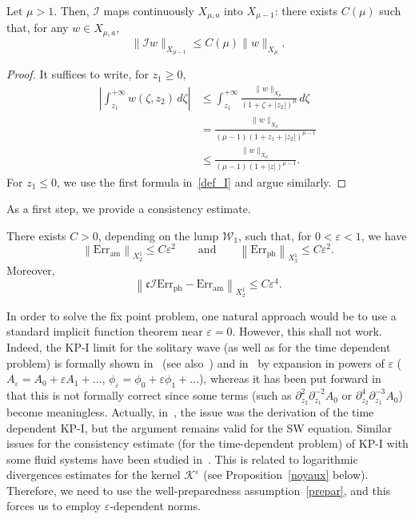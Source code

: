 \documentclass[10pt]{amsart}
\theoremstyle{definition}\newtheorem{defi}[theo]{Definition}\newtheorem{rema}[theo]{Remark}\newtheorem{exam}[theo]{Example}\newtheorem{exem}[theo]{Example}\newtheorem{nota}[theo]{Notation}
\newcommand*\p{\partial}
\newcommand{\amm}{\mathrm{am}}
\newcommand{\phl}{\mathrm{ph}}
\newcommand{\Err}{\mathrm{Err}}
\newcommand*\BI{\mathcal{I}}
\newcommand*\BK{\mathcal{K}}
\newcommand*\BW{\mathcal{W}}
\newcommand*\cs{{\mathfrak c}}
\newcommand*\ii{\infty}
\newcommand*\gs{\geqslant }
\newcommand*\ls{\leqslant }
\newcommand*\e{\varepsilon}
\begin{document}
\begin{prop}\label{primit}
Let $ \mu > 1 $. Then, $ \BI $ maps continuously $ X_{\mu,a} $ into $ X_{\mu -1 } $: there exists $ C(\mu) $ such that, for any $ w \in X_{\mu,a} $,
\[
\| \BI w \|_{X_{\mu-1}} \ls C(\mu) \| w \|_{X_{\mu}}.
\]
\end{prop}

\begin{proof}
It suffices to write, for $ z_1 \gs 0 $,
\begin{align*}
\left\lvert \int_{z_1}^{+\ii} w (\zeta, z_2) \, d\zeta \right\rvert & \ls \int_{z_1}^{+\ii} \frac{ \| w\|_{X_\mu} }{ (1 + \zeta + | z_2|)^\mu } \, d\zeta
\\ & = \frac{\| w\|_{X_\mu} }{ (\mu-1) (1 + z_1 + | z_2|)^{\mu-1} }
\\ &
\ls \frac{\| w\|_{X_\mu} }{ (\mu-1) (1 + | z|)^{\mu-1} }.
\end{align*}
For $z_1 \ls 0 $, we use the first formula in~\eqref{def_I} and argue similarly.
\end{proof}


As a first step, we provide a consistency estimate.
\begin{prop}\label{consistance}
There exists $ C > 0 $, depending on the lump $ \BW_1 $, such that, for $ 0 < \e <1 $, we have
\[
\left\| {\Err}_{\amm} \right\|_{X^1_2} \ls C \e^2
\qquad  \text{and} \qquad
\left\| {\Err}_{\phl} \right\|_{X^1_3} \ls C \e^2.
\]
Moreover,
\[
\left\| \cs \BI {\Err}_{\phl} - {\Err}_{\amm} \right\|_{X^1_2} \ls C \e^4.
\]
\end{prop}



In order to solve the fix point problem, one natural approach would be to use a standard implicit function theorem near $ \e = 0 $. However, this shall not work. Indeed, the KP-I limit for the solitary wave (as well as for the time dependent problem) is formally shown in~\cite{JR} (see also~\cite{BerRob:04}) and in~\cite{Kiv-Pel} by expansion in powers of $ \e $ ($ A_\e = A_0 + \e A_1 + \dotsc $, $ \phi_\e = \phi_0 + \e \phi_1 + \dotsc $), whereas it has been put forward in~\cite[Section~1.3]{Cerror} that this is not formally correct since some terms (such as $ \p_{z_2}^2 \p_{z_1}^{-2} A_0 $ or $ \p_{z_2}^4 \p_{z_1}^{-3} A_0 $) become meaningless. Actually, in~\cite{Cerror}, the issue was the derivation of the time dependent KP-I, but the argument remains valid for the SW equation. Similar issues for the consistency estimate (for the time-dependent problem) of KP-I with some fluid systems have been studied in~\cite{Lan_KPconsist}. This is related to logarithmic divergences estimates for the kernel $ \BK^\e $ (see Proposition~\ref{noyaux} below). Therefore, we need to use the well-preparedness assumption~\eqref{prepar}, and this forces us to employ $ \e $-dependent norms.
\end{document}
